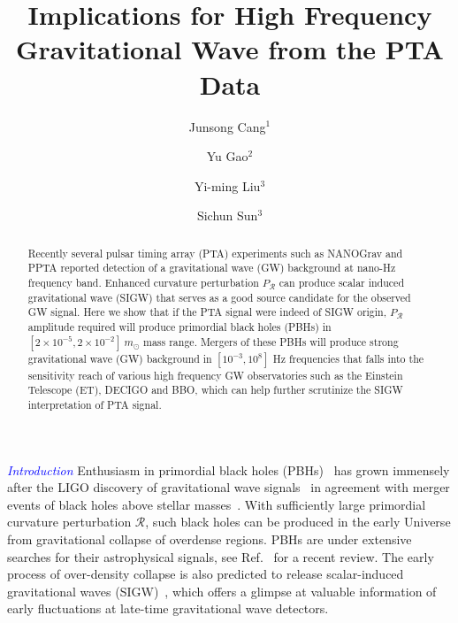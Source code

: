 \documentclass[aps, 10pt, preprintnumbers, prd, amsmath, amssymb,twocolumn, notitlepage, nofootinbib]{revtex4} %
\newcommand{\ps}{P_{\mathcal{R}}}
\newcommand{\ck}[1]{\textcolor{blue}{#1}}
\begin{document}
\title{Implications for High Frequency Gravitational Wave from the PTA Data}
\author{Junsong Cang$^{1}$}
\author{Yu Gao$^{2}$}
\author{Yi-ming Liu$^{3}$}
\author{Sichun Sun$^{3}$}




\begin{abstract}
Recently several pulsar timing array (PTA) experiments such as NANOGrav and PPTA reported detection of a gravitational wave (GW) background at nano-Hz frequency band.
Enhanced curvature perturbation $\ps$ can produce scalar induced gravitational wave (SIGW) that serves as a good source candidate for the observed GW signal.
Here we show that if the PTA signal were indeed of SIGW origin,
$\ps$ amplitude required will produce primordial black holes (PBHs) in $[2 \times 10^{-5}, 2 \times 10^{-2}]\ m_\odot$ mass range.
Mergers of these PBHs will produce strong gravitational wave (GW) background in $[10^{-3}, 10^8]$ Hz frequencies that falls into the sensitivity reach of various high frequency GW observatories such as 
the Einstein Telescope (ET),
DECIGO and BBO,
which can help further scrutinize the SIGW interpretation of PTA signal.

\end{abstract}

\maketitle

\ck{\it Introduction}
Enthusiasm in primordial black holes (PBHs)~\cite{Zeldovich:1967lct,Carr:1974nx} has grown immensely after the LIGO discovery of gravitational wave signals~\cite{LIGOScientific:2018mvr} in agreement with merger events of black holes above stellar masses~\cite{Bird:2016dcv}.
With sufficiently large primordial curvature perturbation $\mathcal{R}$,
such black holes can be produced in the early Universe from gravitational collapse of overdense regions.
PBHs are under extensive searches for their astrophysical signals,
see Ref.~\cite{Carr:2021bzv} for a recent review.
The early process of over-density collapse is also predicted to release scalar-induced gravitational waves (SIGW)~\cite{Domenech:2021ztg,Cang:2022jyc},
which offers a glimpse at valuable information of early fluctuations at late-time gravitational wave detectors.
\end{document}
